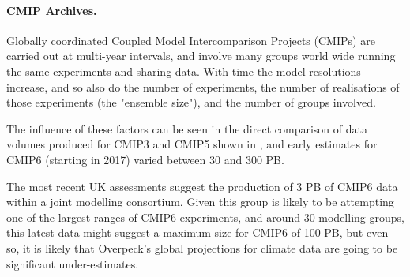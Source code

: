 \paragraph{CMIP Archives.}

Globally coordinated Coupled Model Intercomparison Projects (CMIPs) are carried out at multi-year intervals, and involve many groups world wide running the same experiments and sharing data. With time the model resolutions increase, and so also do the number of experiments, the number of realisations of those experiments (the "ensemble size"), and the number of groups involved.

The influence of these factors can be seen in the direct comparison of data volumes produced for CMIP3 and CMIP5 shown in , and early estimates for CMIP6 (starting in 2017) varied between 30 and 300 PB.

The most recent UK assessments suggest the production of 3 PB of CMIP6 data within a joint modelling consortium. Given this group is likely to be attempting one of the largest ranges of CMIP6 experiments, and around 30 modelling groups, this latest data might suggest a maximum size for CMIP6 of 100 PB, but even so, it is likely that Overpeck's global projections for climate data are going to be significant under-estimates.


